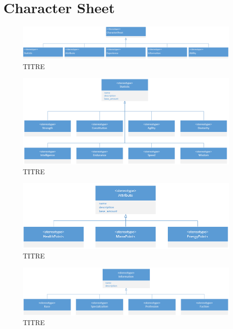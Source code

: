 \section*{Character Sheet} 
\begin{figure}[H]
    \centering
    \includegraphics[width=14cm]{10_img/chap5/03_00_charactersheet.PNG} 
    \caption{TITRE}
\end{figure}
\begin{figure}[H]
    \centering
    \includegraphics[width=14cm]{10_img/chap5/03_00_01_statistic.PNG} 
    \caption{TITRE}
\end{figure}
\begin{figure}[H]
    \centering
    \includegraphics[width=14cm]{10_img/chap5/03_00_02_attribute.PNG} 
    \caption{TITRE}
\end{figure}
\begin{figure}[H]
    \centering
    \includegraphics[width=14cm]{10_img/chap5/03_00_03_information.PNG} 
    \caption{TITRE}
\end{figure}


